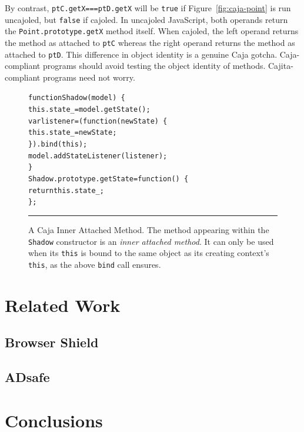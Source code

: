 \documentclass[letterpaper,twocolumn,10pt]{article}
\newcommand{\code}[1]{{\tt {#1}}}              %
\begin{document}
\begin{description}
  By contrast, \code{ptC.getX===ptD.getX} will be \code{true} if 
  Figure~\ref{fig:caja-point} is run uncajoled, but \code{false} if cajoled. 
  In uncajoled JavaScript, both operands return the 
  \code{Point.prototype.getX} method itself. When cajoled, the left operand 
  returns the method as attached to \code{ptC} whereas the right operand 
  returns the method as attached to \code{ptD}. This difference in 
  object identity is a genuine Caja gotcha. Caja-compliant programs should 
  avoid testing the object identity of methods. Cajita-compliant programs 
  need not worry.

\end{description}


\begin{figure}[t!]
\begin{alltt}
function Shadow(model)\ \{
  this.state_ = model.getState();
  var listener = (function(newState)\ \{
    this.state_ = newState;
  \}).bind(this);
  model.addStateListener(listener);
\}
Shadow.prototype.getState = function()\ \{
  return this.state_;
\};
\end{alltt}

\caption[A Caja Inner Attached Method.]{A Caja Inner Attached Method. The method 
appearing within the \code{Shadow} constructor is an \emph{inner attached method}. 
It can only be used when its \code{this} is bound to the same object as its 
creating context's \code{this}, as the above \code{bind} call ensures.\\ } 
\hrule
\label{fig:caja-attached-method}
\end{figure}


\section{Related Work}
\label{sec:related}

\subsection{Browser Shield}


\subsection{ADsafe}


\section{Conclusions}
\end{document}
